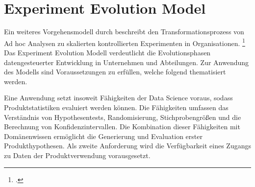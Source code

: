 \section{Experiment Evolution Model}

Ein weiteres Vorgehensmodell durch  beschreibt den Transformationsprozess von Ad hoc Analysen zu skalierten kontrollierten Experimenten in Organisationen. \footcite[Vgl.][S. 5]{Fabijan.2017}
Das Experiment Evolution Modell verdeutlicht die Evolutionsphasen datengesteuerter Entwicklung in Unternehmen und Abteilungen.
Zur Anwendung des Modells sind Voraussetzungen zu erfüllen, welche folgend thematisiert werden.

Eine Anwendung setzt insoweit Fähigkeiten der Data Science voraus, sodass Produktstatistiken evaluiert werden können.
Die Fähigkeiten umfassen das Verständnis von Hypothesentests, Randomisierung, Stichprobengrößen und die Berechnung von Konfidenzintervallen. %
Die Kombination dieser Fähigkeiten mit Domänenwissen ermöglicht die Generierung und Evaluation erster Produkthypothesen.
Als zweite Anforderung wird die Verfügbarkeit eines Zugangs zu Daten der Produktverwendung vorausgesetzt.

